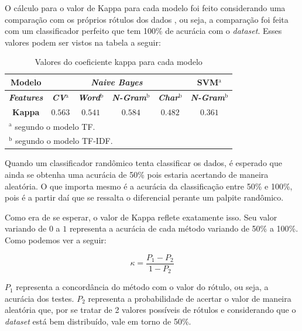 \documentclass[conference]{IEEEtran}
\begin{document}
O cálculo para o valor de Kappa para cada modelo foi feito considerando uma comparação com os próprios rótulos dos dados \cite{cohen_score}, ou seja, a comparação foi feita com um classificador perfeito que tem 100\% de acurácia com o \textit{dataset}. Esses valores podem ser vistos na tabela a seguir:

\begin{table}[htbp]

\caption{Valores do coeficiente kappa para cada modelo}
\begin{center}
\begin{tabular}{|c|c|c|c|c|c|} \hline
\textbf{Modelo} & \multicolumn{4}{|c|}{\textbf{\textit{Naive Bayes}}} & \textbf{SVM}$^{\mathrm{a}}$ \\ \hline
\textbf{\textit{Features}} & \textbf{\textit{CV}$^{\mathrm{a}}$} &  \textbf{\textit{Word}$^{\mathrm{b}}$} & \textbf{\textit{N-Gram}$^{\mathrm{b}}$} & \textbf{\textit{Char}$^{\mathrm{b}}$} & \textbf{\textit{N-Gram}$^{\mathrm{b}}$} \\ \hline
\textbf{Kappa}  & $0.563$ & $0.541$ & $0.584$ & $0.482$ & $0.361$ \\
\hline
\multicolumn{6}{l}{$^{\mathrm{a}}$ segundo o modelo TF.}\\
\multicolumn{6}{l}{$^{\mathrm{b}}$ segundo o modelo TF-IDF.}
\end{tabular}
\label{tab2}
\end{center}

\end{table}

Quando um classificador randômico tenta classificar os dados, é esperado que ainda se obtenha uma acurácia de 50\% pois estaria acertando de maneira aleatória. O que importa mesmo é a acurácia da classificação entre 50\% e 100\%, pois é a partir daí que se ressalta o diferencial perante um palpite randômico.

Como era de se esperar, o valor de Kappa reflete exatamente isso. Seu valor variando de $0$ a $1$ representa a acurácia de cada método variando de 50\% a 100\%. Como podemos ver a seguir:

\begin{equation} \label{eq:kappa}
\kappa = \frac{P_1 - P_2}{1 - P_2}
\end{equation}

\noindent $P_1$ representa a concordância do método com o valor do rótulo, ou seja, a acurácia dos testes. $P_2$ representa a probabilidade de acertar o valor de maneira aleatória que, por se tratar de 2 valores possíveis de rótulos e considerando que o \textit{dataset} está bem distribuído, vale em torno de 50\%.
\end{document}

